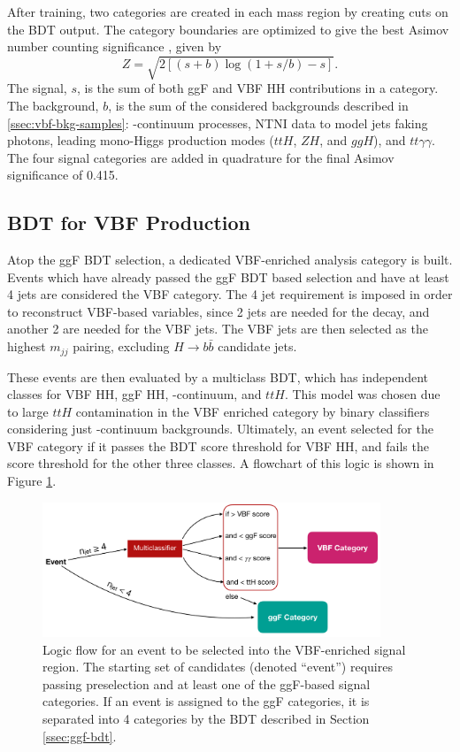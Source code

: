 After training, two categories are created in each mass region by creating cuts on the BDT output. The category boundaries are optimized to give the best Asimov number counting significance \cite{asimov}, given by
\begin{equation}\label{eqn:asimov-significance}
    Z = \sqrt{2[(s+b)\log{(1 + s/b)} -s]}.
\end{equation}
The signal, $s$, is the sum of both ggF and VBF HH contributions in a category. The background, $b$, is the sum of the considered backgrounds described in \ref{ssec:vbf-bkg-samples}: \yy-continuum processes, \gls{NTNI} data to model jets faking photons, leading mono-Higgs production modes ($ttH$, $ZH$, and $ggH$), and $tt\gamma\gamma$. The four signal categories are added in quadrature for the final Asimov significance of 0.415.


\subsection{BDT for VBF Production}\label{ssec:vbf-bdt}
Atop the ggF \gls{BDT} selection, a dedicated VBF-enriched analysis category is built. Events which have already passed the ggF BDT based selection and have at least 4 jets are considered the VBF category. The 4 jet requirement is imposed in order to reconstruct VBF-based variables, since 2 jets are needed for the \Hbb decay, and another 2 are needed for the VBF jets. The VBF jets are then selected as the highest $m_{jj}$ pairing, excluding $H\rightarrow b\bar{b}$ candidate jets.

These events are then evaluated by a multiclass BDT, which has independent classes for VBF HH, ggF HH, \yy-continuum, and $ttH$. This model was chosen due to large $ttH$ contamination in the VBF enriched category by binary classifiers considering just \yy-continuum backgrounds. Ultimately, an event selected for the VBF category if it passes the BDT score threshold for VBF HH, and fails the score threshold for the other three classes. A flowchart of this logic is shown in Figure \ref{fig:vbf-logic}.

\begin{figure}[htbp]
    \centering
	\includegraphics[width=0.9\textwidth]{chapters/chapter6_vbf/images/vbf_logic.png}
    \caption[Logic flow for an event to be selected into the VBF-enriched signal region]{Logic flow for an event to be selected into the VBF-enriched signal region. The starting set of candidates (denoted ``event'') requires passing preselection and at least one of the ggF-based signal categories. If an event is assigned to the ggF categories, it is separated into 4 categories by the \gls{BDT} described in Section \ref{ssec:ggf-bdt}.}
    \label{fig:vbf-logic}
\end{figure}

